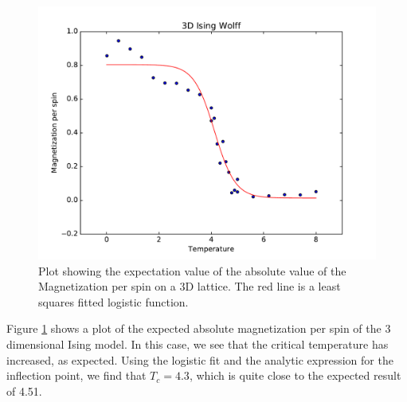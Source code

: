 \documentclass[a4paper]{article}
\begin{document}
\begin{figure}[htb!]
	\centering \includegraphics[width=\linewidth]{3D_Wolff.pdf}
	\caption{Plot showing the expectation value of the absolute value of the Magnetization per spin on a 3D lattice. The red line is a least squares fitted logistic function.}
	\label{fig:wolff3}
\end{figure}

Figure \ref{fig:wolff3} shows a plot of the expected absolute magnetization per spin of the 3 dimensional Ising model. In this case, we see that the critical temperature has increased, as expected. Using the logistic fit and the analytic expression for the inflection point, we find that $T_{c}=4.3$, which is quite close to the expected result of 4.51. 
\end{document}
